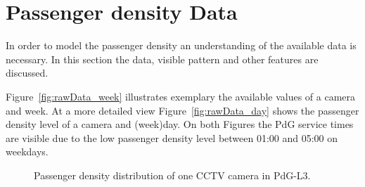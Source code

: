 \section{Passenger density Data}
\label{sec:PassengerDensityData}

In order to model the passenger density an understanding of the available data is necessary. In this section the data, visible pattern and other features are discussed.

Figure~\ref{fig:rawData_week} illustrates exemplary the available values of a camera and week. At a more detailed view Figure~\ref{fig:rawData_day} shows the passenger density level of a camera and (week)day. On both Figures the PdG service times are visible due to the low passenger density level between 01:00 and 05:00 on weekdays.

\begin{figure}[htbp]

  \centering

  \hfill

  \caption{Passenger density distribution of one CCTV camera in PdG-L3.}
  \label{fig:rawData}

\end{figure}